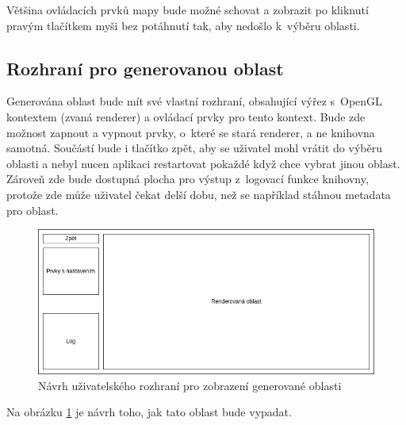 Většina ovládacích prvků mapy bude možné schovat a zobrazit po kliknutí pravým tlačítkem myši bez potáhnutí tak, aby nedošlo k~výběru oblasti.

\subsection*{Rozhraní pro generovanou oblast}
Generována oblast bude mít své vlastní rozhraní, obsahující výřez s~OpenGL kontextem (zvaná renderer) a ovládací prvky pro tento kontext. Bude zde možnost zapnout a vypnout prvky, o~které se stará renderer, a ne knihovna samotná. Součástí bude i tlačítko zpět, aby se uživatel mohl vrátit do výběru oblasti a nebyl nucen aplikaci restartovat pokaždé když chce vybrat jinou oblast. Zároveň zde bude dostupná plocha pro výstup z~logovací funkce knihovny, protože zde může uživatel čekat delší dobu, než se například stáhnou metadata pro oblast.


\begin{figure}[H]
	\centering
	\includegraphics[width=38em]{images/navrh/renderer-ui.png}
	\caption[caption]{Návrh uživatelského rozhraní pro zobrazení generované oblasti} 
	\label{renderer-ui}
\end{figure}

Na obrázku \ref{renderer-ui} je návrh toho, jak tato oblast bude vypadat.

